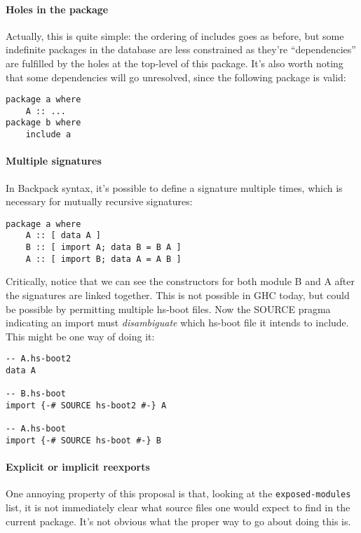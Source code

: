 \documentclass{article}
\begin{document}
\paragraph{Holes in the package} Actually, this is quite simple: the
ordering of includes goes as before, but some indefinite packages in the
database are less constrained as they're ``dependencies'' are fulfilled
by the holes at the top-level of this package.  It's also worth noting
that some dependencies will go unresolved, since the following package
is valid:

\begin{verbatim}
package a where
    A :: ...
package b where
    include a
\end{verbatim}

\paragraph{Multiple signatures}  In Backpack syntax, it's possible to
define a signature multiple times, which is necessary for mutually
recursive signatures:

\begin{verbatim}
package a where
    A :: [ data A ]
    B :: [ import A; data B = B A ]
    A :: [ import B; data A = A B ]
\end{verbatim}

Critically, notice that we can see the constructors for both module B and A
after the signatures are linked together.  This is not possible in GHC
today, but could be possible by permitting multiple hs-boot files.  Now
the SOURCE pragma indicating an import must \emph{disambiguate} which
hs-boot file it intends to include.  This might be one way of doing it:

\begin{verbatim}
-- A.hs-boot2
data A

-- B.hs-boot
import {-# SOURCE hs-boot2 #-} A

-- A.hs-boot
import {-# SOURCE hs-boot #-} B
\end{verbatim}

\paragraph{Explicit or implicit reexports}  One annoying property of
this proposal is that, looking at the \verb|exposed-modules| list, it is
not immediately clear what source files one would expect to find in the
current package.  It's not obvious what the proper way to go about doing
this is.
\end{document}
